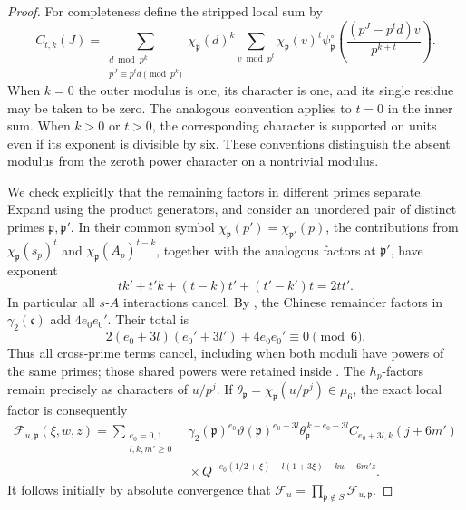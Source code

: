\begin{proof}
For completeness define the stripped local sum by
\begin{equation}
 C_{t,k}(J)=
 \sum_{\substack{d\bmod p^k\\p^J\equiv p^td\pmod{p^k}}}
 \chi_{\mathfrak p}(d)^k
 \sum_{v\bmod p^t}\chi_{\mathfrak p}(v)^t
       \psi_{\mathfrak p}^{\circ}
             \left(\frac{(p^J-p^td)v}{p^{k+t}}\right).
\label{eq:C-local-definition}
\end{equation}
When \(k=0\) the outer modulus is one, its character is one, and its
single residue may be taken to be zero.  The analogous convention applies
to \(t=0\) in the inner sum.  When \(k>0\) or \(t>0\), the corresponding
character is supported on units even if its exponent is divisible by
six.  These conventions distinguish the absent modulus from the zeroth
power character on a nontrivial modulus.

We check explicitly that the remaining factors in different primes
separate.  Expand  using the product generators,
and consider an unordered pair of distinct primes \(\mathfrak p,\mathfrak
p'\).  In their common symbol
\(\chi_{\mathfrak p}(p')=\chi_{\mathfrak p'}(p)\), the contributions from
\(\chi_{\mathfrak p}(s_p)^t\) and
\(\chi_{\mathfrak p}(A_p)^{t-k}\), together with the analogous factors at
\(\mathfrak p'\), have exponent
\[
 tk'+t'k+(t-k)t'+(t'-k')t=2tt'.
\]
In particular all \(s\)-\(A\) interactions cancel.  By
, the Chinese remainder factors in
\(\gamma_2(\mathfrak c)\) add \(4e_0e_0'\).  Their total is
\[
 2(e_0+3l)(e_0'+3l')+4e_0e_0'\equiv0\pmod6.
\]
Thus all cross-prime terms cancel, including when both moduli have powers
of the same primes; those shared powers were retained inside
.  The \(h_p\)-factors remain precisely as
characters of \(u/p^j\).  If
\(\theta_{\mathfrak p}=\chi_{\mathfrak p}(u/p^j)\in\mu_6\), the exact
local factor is consequently
\begin{equation}
 \begin{split}
 \mathcal F_{u,\mathfrak p}(\xi,w,z)
  =\sum_{\substack{e_0=0,1\\l,k,m'\ge0}}
  &\gamma_2(\mathfrak p)^{e_0}\vartheta(\mathfrak p)^{e_0+3l}
   \theta_{\mathfrak p}^{\,k-e_0-3l}C_{e_0+3l,k}(j+6m')\\
  &{}\times
  Q^{-e_0(1/2+\xi)-l(1+3\xi)-kw-6m'z}.
 \end{split}
\label{eq:exact-Euler-factor}
\end{equation}
It follows initially by absolute convergence that
\(\mathcal F_u=\prod_{\mathfrak p\notin S}\mathcal F_{u,\mathfrak p}\).


\end{proof}

